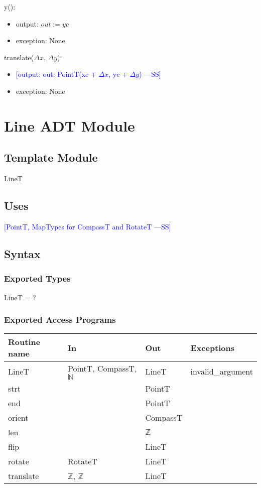 \documentclass[12pt]{article}
\newcommand{\authornote}[3]{\textcolor{#1}{[#3 ---#2]}}
\newcommand{\authornote}[3]{}
\newcommand{\wss}[1]{\authornote{blue}{SS}{#1}}
\begin{document}
\noindent y():
\begin{itemize}
\item output: $out := yc$
\item exception: None
\end{itemize}

\noindent translate($\Delta x$, $\Delta y$):
\begin{itemize}
\item \wss{output: out: PointT(xc + $\Delta x$, yc + $\Delta y$)}
\item exception: None
\end{itemize}

\newpage

\section* {Line ADT Module}

\subsection*{Template Module}

LineT

\subsection* {Uses}

\wss{PointT, MapTypes for CompassT and RotateT}

\subsection* {Syntax}

\subsubsection* {Exported Types}

LineT = ?

\subsubsection* {Exported Access Programs}

\begin{tabular}{| l | l | l | l |}
\hline
\textbf{Routine name} & \textbf{In} & \textbf{Out} & \textbf{Exceptions}\\
\hline
LineT & PointT, CompassT, $\mathbb{N}$ & LineT & invalid\_argument\\
\hline
strt & ~ & PointT & ~\\
\hline
end & ~ & PointT & ~\\
\hline
orient & ~ & CompassT & ~\\
\hline
 len & ~ & $\mathbb{Z}$ & ~\\
\hline
flip & ~ & LineT & ~\\
\hline
rotate & RotateT & LineT & ~\\
\hline
translate & $\mathbb{Z}$, $\mathbb{Z}$ & LineT  & ~\\
\hline
\end{tabular}
\end{document}
